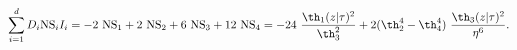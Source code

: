 \begin{equation} \label{2^4-dirac-index}
  \sum_{i=1}^d D_i {\rm NS}_i I_i = -2 ~{\rm NS}_1 +2 ~{\rm
  NS}_2 + 6~{\rm NS}_3 +12~ {\rm NS}_4 = -24 ~{\th_1(z|\tau)^2 \over
  \th_3^2} + 2(\th_2^4-\th_4^4)   ~{\th_3(z|\tau)^2 \over\eta^6}.
\end{equation}


